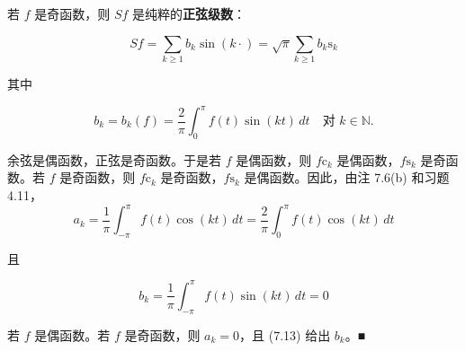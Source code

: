 \begin{remark}
\begin{items}
若 $ f $ 是奇函数，则 $ Sf $ 是纯粹的\textbf{正弦级数}：

\[
Sf = \sum_{k \ge 1} b_{k}\sin(k\cdot) = \sqrt{\pi}\sum_{k \ge 1} b_{k}\mathrm{s}_{k}
\]

其中

\begin{equation}
b_{k} = b_{k}(f) = \frac{2}{\pi}\int_{0}^{\pi} f(t)\sin(kt) \, dt \quad \text{对 } k \in \mathbb{N} .\tag{7.13}
\end{equation}

\proofhead
余弦是偶函数，正弦是奇函数。于是若 $ f $ 是偶函数，则 $ f\mathrm{c}_{k} $ 是偶函数，$ f\mathrm{s}_{k} $ 是奇函数。若 $ f $ 是奇函数，则 $ f\mathrm{c}_{k} $ 是奇函数，$ f\mathrm{s}_{k} $ 是偶函数。因此，由注 7.6(b) 和习题 4.11，
\[
a_{k} = \frac{1}{\pi}\int_{-\pi}^{\pi} f(t)\cos(kt) \, dt = \frac{2}{\pi}\int_{0}^{\pi} f(t)\cos(kt) \, dt
\]

且

\[
b_{k} = \frac{1}{\pi}\int_{-\pi}^{\pi} f(t)\sin(kt) \, dt = 0
\]

若 $ f $ 是偶函数。若 $ f $ 是奇函数，则 $ a_{k} = 0 $，且 (7.13) 给出 $ b_{k} $。\nobreak\hspace{0.35em}■

\end{items}

\end{remark}

